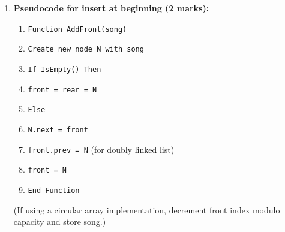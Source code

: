\documentclass[11pt]{article}
\begin{document}
\begin{corrige}
\begin{enumerate}
\item \textbf{Pseudocode for insert at beginning (2 marks):}
\begin{enumerate}
\item \texttt{Function AddFront(song)}
\item \quad \texttt{Create new node N with song}
\item \quad \texttt{If IsEmpty() Then}
\item \quad \quad \texttt{front = rear = N}
\item \quad \texttt{Else}
\item \quad \quad \texttt{N.next = front}
\item \quad \quad \texttt{front.prev = N} \quad (for doubly linked list)
\item \quad \quad \texttt{front = N}
\item \texttt{End Function}
\end{enumerate}
(If using a circular array implementation, decrement front index modulo capacity and store song.)
\end{enumerate}
\end{corrige}
\end{document}
